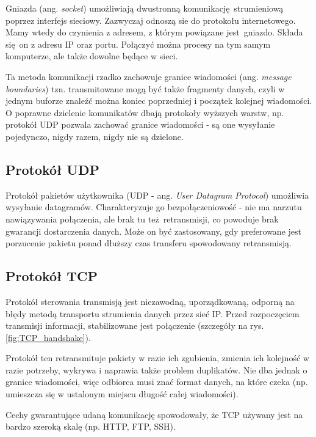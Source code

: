Gniazda (ang. \textit{socket}) umożliwiają dwustronną komunikację strumieniową poprzez interfejs sieciowy. Zazwyczaj odnoszą sie do protokołu internetowego. Mamy wtedy do czynienia z adresem, z którym powiązane jest gniazdo. Składa się on z adresu IP oraz portu. Połączyć można procesy na tym samym komputerze, ale także dowolne będące w sieci. 

Ta metoda komunikacji rzadko zachowuje granice wiadomości (ang. \textit{message boundaries}) tzn. transmitowane mogą być także fragmenty danych, czyli w jednym buforze znaleźć można koniec poprzedniej i początek kolejnej wiadomości. O poprawne dzielenie komunikatów dbają protokoły wyższych warstw, np. protokół UDP pozwala zachować granice wiadomości - są one wysyłanie pojedynczo, nigdy razem, nigdy nie są dzielone.


\subsection{Protokół UDP}

Protokół pakietów użytkownika (UDP - ang. \textit{User Datagram Protocol}) umożliwia wysyłanie datagramów. Charakteryzuje go bezpołączeniowość - nie ma narzutu nawiązywania połączenia, ale brak tu też retransmisji, co powoduje brak gwarancji dostarczenia danych. Może on być zastosowany, gdy preferowane jest porzucenie pakietu ponad dłuższy czas transferu spowodowany retransmisją.


\subsection{Protokół TCP}
\label{TCP}

Protokół sterowania transmisją jest niezawodną, uporządkowaną, odporną na błędy metodą transportu strumienia danych przez sieć IP. Przed rozpoczęciem transmisji informacji, stabilizowane jest połączenie (szczegóły na rys. \ref{fig:TCP_handshake}).

Protokół ten retransmituje pakiety w razie ich zgubienia, zmienia ich kolejność w razie potrzeby, wykrywa i naprawia także problem duplikatów. Nie dba jednak o granice wiadomości, więc odbiorca musi znać format danych, na które czeka (np. umieszcza się w ustalonym miejscu długość całej wiadomości).

Cechy gwarantujące udaną komunikację spowodowały, że TCP używany jest na bardzo szeroką skalę (np. HTTP, FTP, SSH).

